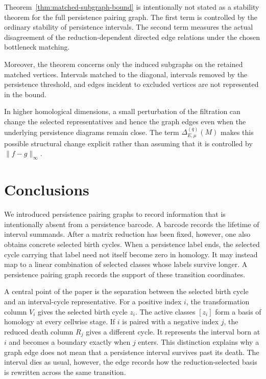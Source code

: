 \documentclass[11pt]{article}
\theoremstyle{paperdefinition}
\theoremstyle{paperplain}
\theoremstyle{paperremark}
\begin{document}
Theorem~\ref{thm:matched-subgraph-bound} is intentionally not stated as a stability theorem for the full persistence pairing graph. The first term is controlled by the ordinary stability of persistence intervals. The second term measures the actual disagreement of the reduction-dependent directed edge relations under the chosen bottleneck matching.

Moreover, the theorem concerns only the induced subgraphs on the retained matched vertices. Intervals matched to the diagonal, intervals removed by the persistence threshold, and edges incident to excluded vertices are not represented in the bound.

In higher homological dimensions, a small perturbation of the filtration can change the selected representatives and hence the graph edges even when the underlying persistence diagrams remain close. The term $\Delta_{E,\mu}^{(q)}(M)$ makes this possible structural change explicit rather than assuming that it is controlled by $\|f-g\|_\infty$.

\section{Conclusions}

We introduced persistence pairing graphs to record information that is intentionally absent from a persistence barcode. A barcode records the lifetime of interval summands. After a matrix reduction has been fixed, however, one also obtains concrete selected birth cycles. When a persistence label ends, the selected cycle carrying that label need not itself become zero in homology. It may instead map to a linear combination of selected classes whose labels survive longer. A persistence pairing graph records the support of these transition coordinates.

A central point of the paper is the separation between the selected birth cycle and an interval-cycle representative. For a positive index $i$, the transformation column $V_i$ gives the selected birth cycle $z_i$. The active classes $[z_i]$ form a basis of homology at every cellwise stage. If $i$ is paired with a negative index $j$, the reduced death column $R_j$ gives a different cycle. It represents the interval born at $i$ and becomes a boundary exactly when $j$ enters. This distinction explains why a graph edge does not mean that a persistence interval survives past its death. The interval dies as usual, however, the edge records how the reduction-selected basis is rewritten across the same transition.
\end{document}
